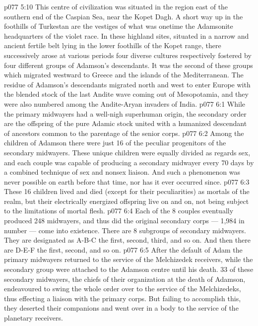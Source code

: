 \vs p077 5:10 This centre of civilization was situated in the region east of the southern end of the Caspian Sea, near the Kopet Dagh. A short way up in the foothills of Turkestan are the vestiges of what was onetime the Adamsonite headquarters of the violet race. In these highland sites, situated in a narrow and ancient fertile belt lying in the lower foothills of the Kopet range, there successively arose at various periods four diverse cultures respectively fostered by four different groups of Adamson’s descendants. It was the second of these groups which migrated westward to Greece and the islands of the Mediterranean. The residue of Adamson’s descendants migrated north and west to enter Europe with the blended stock of the last Andite wave coming out of Mesopotamia, and they were also numbered among the Andite\hyp{}Aryan invaders of India.
\vs p077 6:1 While the primary midwayers had a well\hyp{}nigh superhuman origin, the secondary order are the offspring of the pure Adamic stock united with a humanized descendant of ancestors common to the parentage of the senior corps.
\vs p077 6:2 Among the children of Adamson there were just 16 of the peculiar progenitors of the secondary midwayers. These unique children were equally divided as regards sex, and each couple was capable of producing a secondary midwayer every 70 days by a combined technique of sex and nonsex liaison. And such a phenomenon was never possible on earth before that time, nor has it ever occurred since.
\vs p077 6:3 These 16 children lived and died (except for their peculiarities) as mortals of the realm, but their electrically energized offspring live on and on, not being subject to the limitations of mortal flesh.
\vs p077 6:4 Each of the 8 couples eventually produced 248 midwayers, and thus did the original secondary corps --- 1,984 in number --- come into existence. There are 8 subgroups of secondary midwayers. They are designated as A\hyp{}B\hyp{}C the first, second, third, and so on. And then there are D\hyp{}E\hyp{}F the first, second, and so on.
\vs p077 6:5 \pc After the default of Adam the primary midwayers returned to the service of the Melchizedek receivers, while the secondary group were attached to the Adamson centre until his death. 33 of these secondary midwayers, the chiefs of their organization at the death of Adamson, endeavoured to swing the whole order over to the service of the Melchizedeks, thus effecting a liaison with the primary corps. But failing to accomplish this, they deserted their companions and went over in a body to the service of the planetary receivers.
